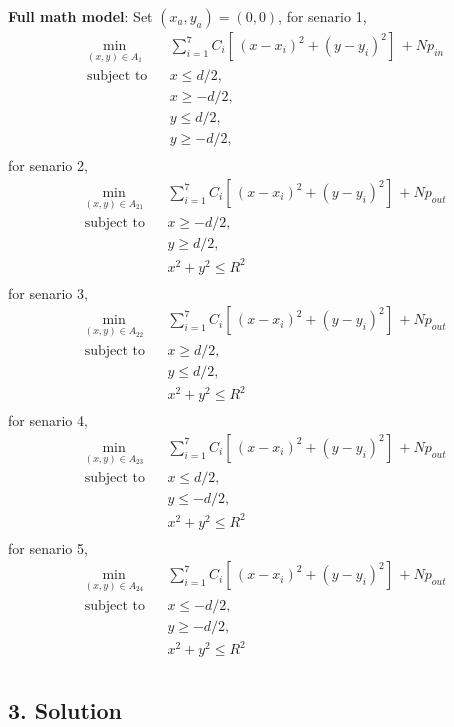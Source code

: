 \documentclass[11pt]{article}
\begin{document}
\textbf{Full math model}: Set \((x_a, y_a)=(0,0)\), for senario 1,
\[  \begin{aligned}
  & \underset{(x,y)\in A_1}{\text{min}}
  & & \sum_{i=1}^7 C_i  [ \,(x-x_i)^2+(y-y_i)^2]\,+Np_{in} \\
  & \text{subject to}
  & & x\leq d/2, \\
  &&& x\geq -d/2, \\
  &&& y\leq d/2, \\
  &&& y\geq -d/2, \\
  \end{aligned}\] for senario 2, \[  \begin{aligned}
  & \underset{(x,y)\in A_{21}}{\text{min}}
  & & \sum_{i=1}^7 C_i  [ \,(x-x_i)^2+(y-y_i)^2]\,+Np_{out} \\
  & \text{subject to}
  & & x\geq -d/2, \\
  &&& y\geq d/2, \\
  &&& x^2+y^2\leq R^2 \\
  \end{aligned}\] for senario 3, \[  \begin{aligned}
  & \underset{(x,y)\in A_{22}}{\text{min}}
  & & \sum_{i=1}^7 C_i  [ \,(x-x_i)^2+(y-y_i)^2]\,+Np_{out} \\
  & \text{subject to}
  & & x\geq d/2, \\
  &&& y\leq d/2, \\
  &&& x^2+y^2\leq R^2 \\
  \end{aligned}\] for senario 4, \[  \begin{aligned}
  & \underset{(x,y)\in A_{23}}{\text{min}}
  & & \sum_{i=1}^7 C_i  [ \,(x-x_i)^2+(y-y_i)^2]\,+Np_{out} \\
  & \text{subject to}
  & & x\leq d/2, \\
  &&& y\leq -d/2, \\
  &&& x^2+y^2\leq R^2 \\
  \end{aligned}\] for senario 5, \[  \begin{aligned}
  & \underset{(x,y)\in A_{24}}{\text{min}}
  & & \sum_{i=1}^7 C_i  [ \,(x-x_i)^2+(y-y_i)^2]\,+Np_{out} \\
  & \text{subject to}
  & & x\leq -d/2, \\
  &&& y\geq -d/2, \\
  &&& x^2+y^2\leq R^2 \\
  \end{aligned}\]

    \hypertarget{solution}{%
\subsection{3. Solution}\label{solution}}
\end{document}
